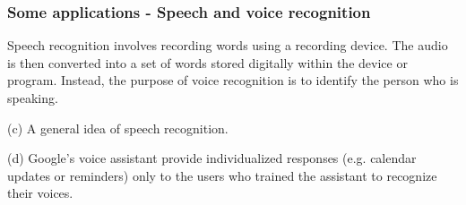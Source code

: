 \documentclass{beamer}
\begin{document}
	\begin{frame}
		\frametitle{Some applications - Speech and voice recognition}
		Speech recognition involves recording words using a recording device. The audio is then converted into a set of words stored digitally within the device or program. Instead, the purpose of voice recognition is to identify the person who is speaking.
		\begin{figure}
			\centering
			\qquad
		\end{figure}
	(c) A general idea of speech recognition. 
	
	(d) Google’s voice assistant provide individualized responses (e.g. calendar updates or reminders) only to the users who trained the assistant to recognize their voices.
	
	\end{frame}
\end{document}
